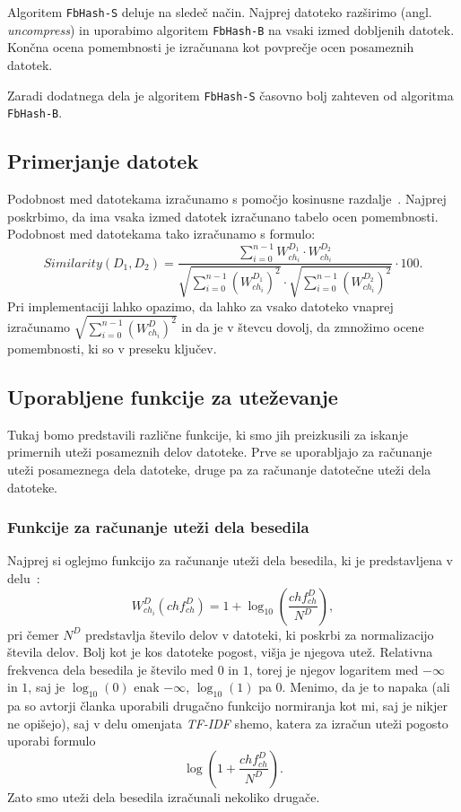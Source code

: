 \documentclass{acm_proc_article-sp}
\begin{document}
Algoritem \texttt{FbHash-S} deluje na sledeč način. Najprej datoteko razširimo (angl. \emph{uncompress}) in uporabimo algoritem \texttt{FbHash-B} na vsaki izmed dobljenih datotek. Končna ocena pomembnosti je izračunana kot povprečje ocen posameznih datotek.

Zaradi dodatnega dela je algoritem \texttt{FbHash-S} časovno bolj zahteven od algoritma \texttt{FbHash-B}.

\subsection{Primerjanje datotek}
\label{doc-compare}

Podobnost med datotekama izračunamo s pomočjo kosinusne razdalje~\cite{Salton88term-weightingapproaches}. Najprej poskrbimo, da ima vsaka izmed datotek izračunano tabelo ocen pomembnosti. Podobnost med datotekama tako izračunamo s formulo: \begin{displaymath} Similarity(D_1, D_2)=\frac{\sum_{i=0}^{n-1} W_{ch_i}^{D_1} \cdot W_{ch_i}^{D_2}}{\sqrt{\sum_{i=0}^{n-1} (W_{ch_i}^{D_1})^2}\cdot\sqrt{\sum_{i=0}^{n-1} (W_{ch_i}^{D_2})^2}}\cdot 100. \end{displaymath} Pri implementaciji lahko opazimo, da lahko za vsako datoteko vnaprej izračunamo $\sqrt{\sum_{i=0}^{n-1} (W_{ch_i}^{D})^2}$ in da je v števcu dovolj, da zmnožimo ocene pomembnosti, ki so v preseku ključev.

\subsection{Uporabljene funkcije za uteževanje}
\label{weight-functions}

Tukaj bomo predstavili različne funkcije, ki smo jih preizkusili za iskanje primernih uteži posameznih delov datoteke. Prve se uporabljajo za računanje uteži posameznega dela datoteke, druge pa za računanje datotečne uteži dela datoteke.
\\
\subsubsection{Funkcije za računanje uteži dela besedila}\label{utezivclanku}
Najprej si oglejmo funkcijo za računanje uteži dela besedila, ki je predstavljena v delu~\cite{fbhash}:
\[ W_{ch_i}^{D}(ch f_{ch}^D) = 1 + \log_{10}\left(\frac{ch f_{ch}^D}{N^D}\right),\]
pri čemer $N^D$ predstavlja število delov v datoteki, ki poskrbi za normalizacijo števila delov. Bolj kot je kos datoteke pogost, višja je njegova utež. Relativna frekvenca dela be\-se\-di\-la je število med $0$ in $1$, torej je njegov logaritem med $-\infty$ in $1$, saj je $\log_{10}(0)$ enak $-\infty$, $\log_{10}(1)$ pa 0. Menimo, da je to napaka (ali pa so avtorji članka uporabili drugačno funkcijo normiranja kot mi, saj je nikjer ne opišejo), saj v delu omenjata \textit{TF-IDF} shemo, katera za izračun uteži pogosto uporabi formulo
\begin{displaymath}\log\left(1 + \frac{ch f_{ch}^D}{N^D}\right).\end{displaymath}
Zato smo uteži dela besedila izračunali nekoliko drugače.
\end{document}
